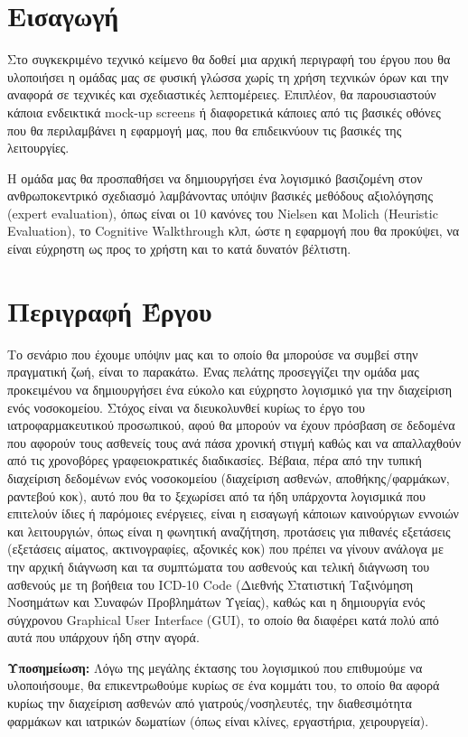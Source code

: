 \documentclass{article}
\begin{document}
{
  \hypersetup{linkcolor=black}
  \tableofcontents
}

\section{Εισαγωγή}
    Στο συγκεκριμένο τεχνικό κείμενο θα δοθεί μια αρχική περιγραφή του έργου που θα υλοποιήσει η ομάδας μας σε φυσική γλώσσα χωρίς τη χρήση τεχνικών όρων και την αναφορά σε τεχνικές και σχεδιαστικές λεπτομέρειες. Επιπλέον, θα παρουσιαστούν κάποια ενδεικτικά mock-up screens ή διαφορετικά κάποιες από τις βασικές οθόνες που θα περιλαμβάνει η εφαρμογή μας, που θα επιδεικνύουν τις βασικές της λειτουργίες. \par
    Η ομάδα μας θα προσπαθήσει να δημιουργήσει ένα λογισμικό βασιζομένη στον ανθρωποκεντρικό σχεδιασμό λαμβάνοντας υπόψιν βασικές μεθόδους αξιολόγησης (expert evaluation), όπως είναι οι 10 κανόνες του Nielsen και Molich (Heuristic Evaluation), 
    το Cognitive Walkthrough κλπ, ώστε η εφαρμογή που θα προκύψει, να είναι εύχρηστη ως προς το χρήστη και το κατά δυνατόν βέλτιστη.
    

\section{Περιγραφή Έργου}

Το σενάριο που έχουμε υπόψιν μας και το οποίο θα μπορούσε να συμβεί στην πραγματική ζωή, είναι το παρακάτω. Ένας πελάτης προσεγγίζει την ομάδα μας προκειμένου να δημιουργήσει ένα εύκολο και εύχρηστο λογισμικό για την διαχείριση ενός νοσοκομείου. Στόχος είναι να διευκολυνθεί κυρίως το έργο του ιατροφαρμακευτικού προσωπικού, αφού θα μπορούν να έχουν πρόσβαση σε δεδομένα που αφορούν τους ασθενείς τους ανά πάσα χρονική στιγμή καθώς και να απαλλαχθούν από τις χρονοβόρες γραφειοκρατικές διαδικασίες. Βέβαια, πέρα από την τυπική διαχείριση δεδομένων ενός νοσοκομείου (διαχείριση ασθενών, αποθήκης/φαρμάκων, ραντεβού κοκ), αυτό που θα το ξεχωρίσει από τα ήδη υπάρχοντα λογισμικά που επιτελούν ίδιες ή παρόμοιες ενέργειες, είναι η εισαγωγή κάποιων καινούργιων εννοιών και λειτουργιών, όπως είναι η φωνητική αναζήτηση, προτάσεις για πιθανές εξετάσεις (εξετάσεις αίματος, ακτινογραφίες, αξονικές κοκ) που πρέπει να γίνουν ανάλογα με την αρχική διάγνωση και τα συμπτώματα του ασθενούς και τελική διάγνωση του ασθενούς με τη βοήθεια του ICD-10 Code (Διεθνής Στατιστική Ταξινόμηση Νοσημάτων και Συναφών Προβλημάτων Υγείας), καθώς και η δημιουργία ενός σύγχρονου Graphical User Interface (GUI), το οποίο θα διαφέρει κατά πολύ από αυτά που υπάρχουν ήδη στην αγορά. \par
\textbf{Υποσημείωση:} Λόγω της μεγάλης έκτασης του λογισμικού που επιθυμούμε να υλοποιήσουμε, θα επικεντρωθούμε κυρίως σε ένα κομμάτι του, το οποίο θα αφορά κυρίως την διαχείριση ασθενών από γιατρούς/νοσηλευτές, την διαθεσιμότητα φαρμάκων και ιατρικών δωματίων (όπως είναι κλίνες, εργαστήρια, χειρουργεία).
\end{document}

